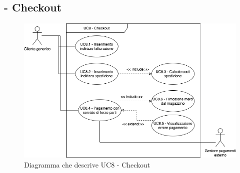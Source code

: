 \stepUserCase
\subsection{ - Checkout}
\begin{figure}[H]
    \centering
    \includegraphics[width=\linewidth]{res/images/UC/UC8.png}
    \caption{Diagramma che descrive UC8 - Checkout}
\end{figure}
